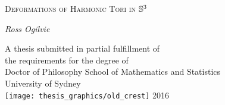 
\cleardoublepage\thispagestyle{empty}
\begin{center}
{\huge{\scshape Deformations of Harmonic Tori in} $\S^3$\par}
\vspace{2cm}
{\Large\itshape Ross Ogilvie \par}
\vfil\vfil\vfil
    A thesis submitted in partial fulfillment of\\
    the requirements for the degree of\\
    Doctor of Philosophy
\vfil\vfil
  {\large{School of Mathematics and Statistics}\\[5pt]
  University of Sydney}\\
  \vskip6mm
  \texttt{[image: thesis\_graphics/old\_crest]}
\vfil
  \normalsize 2016
\vfil
\end{center}
\cleardoublepage
